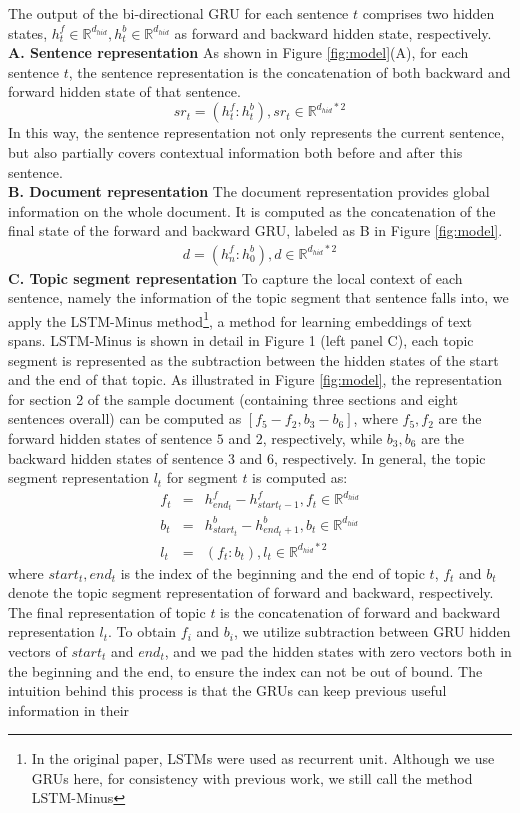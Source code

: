 The output of the bi-directional GRU for each sentence $t$ comprises two hidden states, $h^f_t \in \mathbb{R}^{d_{hid}},h^b_t \in \mathbb{R}^{d_{hid}}$ as forward and backward hidden state, respectively.\\
\textbf{A. Sentence representation} As shown in Figure \ref{fig:model}(A), for each sentence $t$, the sentence representation is the concatenation of both backward and forward hidden state of that sentence.  $$sr_t = (h^f_t:h^b_t),   sr_t\in\mathbb{R}^{d_{hid}*2}$$ In this way, the sentence representation not only represents the current sentence, but also partially covers contextual information both before and after this sentence. \\
\textbf{B. Document representation}
The document representation provides global information on the whole document. It is computed as the concatenation of the final state of the forward and backward GRU, labeled as B in Figure \ref{fig:model}. \cite{selection_emnlp2018}
\begin{eqnarray*}
d = (h^f_{n}:h^b_0), d\in\mathbb{R}^{d_{hid}*2}
\end{eqnarray*}
\textbf{C. Topic segment representation}
To capture the local context of each sentence, namely the information of the topic segment that sentence falls into, we apply the LSTM-Minus method\footnote{In the original paper, LSTMs were used as recurrent unit. Although we use GRUs here, for consistency with previous work, we still call the method LSTM-Minus}, a method for learning embeddings of text spans. LSTM-Minus is shown in detail in Figure 1 (left panel C), each topic segment is represented as the subtraction between the hidden states of the start and the end of that topic. As illustrated in Figure \ref{fig:model}, the representation for section 2 of the sample document (containing three sections and eight sentences overall) can be computed as $[f_5-f_2,b_3-b_6]$, where $f_5, f_2$ are the forward hidden states of sentence $5$ and $2$, respectively, while $b_3, b_6$ are the backward hidden states of sentence $3$ and $6$, respectively. In general, the topic segment representation  $l_t$ for segment $t$ is computed as:
\begin{eqnarray*}
f_t&=& h^f_{end_t}- h^f_{start_t-1}, f_t \in\mathbb{R}^{d_{hid}}\\
b_t&=& h^b_{start_t}- h^b_{end_t+1}, b_t \in\mathbb{R}^{d_{hid}}\\
l_t&=& (f_t:b_t), l_t \in\mathbb{R}^{d_{hid}*2}
\end{eqnarray*}
where $start_t, end_t$ is the index of the beginning and the end of topic $t$, $f_t$ and $b_t$ denote the topic segment representation of forward and backward, respectively. The final representation of topic $t$ is the concatenation of forward and backward representation $l_t$. To obtain $f_i$ and $b_i$, we utilize subtraction between GRU hidden vectors of $start_t$ and $end_t$, and we pad the hidden states with zero vectors both in the beginning and the end, to ensure the index can not be out of bound. The intuition behind this process is that the GRUs can keep previous useful information in their
